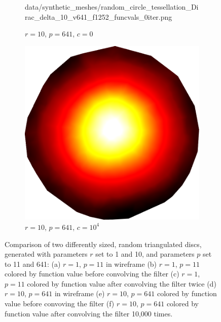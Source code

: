 \begin{figure}[ht]
\begin{subfigure}[b]{0.32\linewidth}
		{data/synthetic_meshes/random_circle_tessellation_Dirac_delta_10_v641_f1252_funcvals_0iter.png}
		\caption{$r=10$, $p=641$, $c=0$}\label{fig:rcirc.d}
	\end{subfigure}
	\begin{subfigure}[b]{0.32\linewidth}
		\includegraphics[width=\linewidth]
		{data/synthetic_meshes/random_circle_tessellation_Dirac_delta_10_v641_f1252_funcvals_10000iter.png}
		\caption{$r=10$, $p=641$, $c=10^4$}\label{fig:rcirc.f}
	\end{subfigure}
	\caption[Six views, comparing two differently sized, random triangulated discs]{Comparison of two differently sized, random triangulated discs, generated with parameters $r$ set to 1 and 10, and parameters $p$ set to 11 and 641: (a) $r=1$, $p=11$ in wireframe (b) $r=1$, $p=11$ colored by function value before convolving the filter (c) $r=1$, $p=11$ colored by function value after convolving the filter twice (d) $r=10$, $p=641$ in wireframe (e) $r=10$, $p=641$ colored by function value before convoving the filter (f) $r=10$, $p=641$ colored by function value after convolving the filter 10,000 times.}
	\label{fig:rdisc}
\end{figure}

